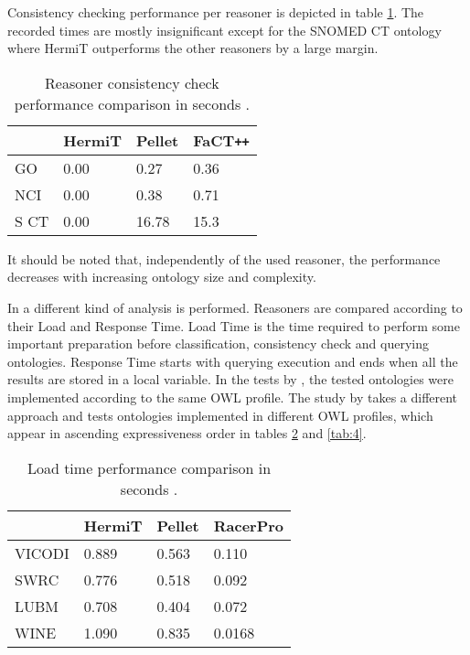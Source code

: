 Consistency checking performance per reasoner is depicted in table \ref{tab:2}. The recorded times are mostly insignificant except for the SNOMED CT ontology where HermiT outperforms the other reasoners by a large margin.

\begin{table}[]
\centering
\caption{Reasoner consistency check performance comparison in seconds \cite{Dentler2011}.}
\begin{tabular}{|l|l|l|l|}
\hline
      &  HermiT  &  Pellet   &  FaCT\texttt{++}  \\ \hline
GO    &    0.00  &  0.27     &  0.36   \\ \hline
NCI   &    0.00  &  0.38     &  0.71   \\ \hline
S CT  &    0.00  &  16.78    &  15.3   \\ \hline
\end{tabular}
\label{tab:2}
\end{table}

It should be noted that, independently of the used reasoner, the performance decreases with increasing ontology size and complexity.

In \cite{Bock2008} a different kind of analysis is performed. Reasoners are compared according to their Load and Response Time. Load Time is the time required to perform some important preparation before classification, consistency check and querying ontologies. Response Time starts with querying execution and ends when all the results are stored in a local variable. In the tests by \cite{Dentler2011}, the tested ontologies were implemented according to the same OWL profile. The study by \cite{Bock2008} takes a different approach and tests ontologies implemented in different OWL profiles, which appear in ascending expressiveness order in tables \ref{tab:3} and \ref{tab:4}. 

\begin{table}[]
\centering
\caption{Load time performance comparison in seconds \cite{Bock2008}.}
\begin{tabular}{|l|l|l|l|}
\hline
          &   HermiT  &  Pellet & RacerPro\\ \hline
VICODI    &    0.889  &  0.563  & 0.110   \\ \hline
SWRC      &    0.776  &  0.518  & 0.092   \\ \hline
LUBM      &    0.708  &  0.404  & 0.072   \\ \hline
WINE      &    1.090  &  0.835  & 0.0168  \\ \hline
\end{tabular}
\label{tab:3}
\end{table}

